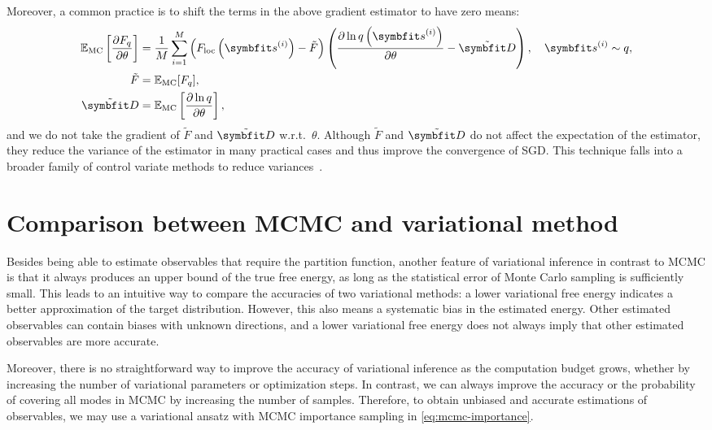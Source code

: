 Moreover, a common practice is to shift the terms in the above gradient estimator to have zero means:
\begin{align}
\bbE_\text{MC}\left[ \frac{\partial F_q}{\partial \theta} \right]
&= \frac{1}{M} \sum_{i = 1}^M \left( F_\text{loc}\left( \vs^{(i)} \right) - \tilde{F} \right) \left( \frac{\partial \ln q\left( \vs^{(i)} \right)}{\partial \theta} - \tilde{\vD} \right), \quad
\vs^{(i)} \sim q, \label{eq:fq-grad-baseline} \\
\tilde{F} &= \bbE_\text{MC}[F_q], \\
\tilde{\vD} &= \bbE_\text{MC}\left[ \frac{\partial \ln q}{\partial \theta} \right],
\end{align}
and we do not take the gradient of $\tilde{F}$ and $\tilde{\vD}$ w.r.t.\ $\theta$. Although $\tilde{F}$ and $\tilde{\vD}$ do not affect the expectation of the estimator, they reduce the variance of the estimator in many practical cases and thus improve the convergence of SGD. This technique falls into a broader family of control variate methods to reduce variances~\cite{ranganath2014black, wan2019neural}.

\section{Comparison between MCMC and variational method}
\label{sec:compare-mcmc}

Besides being able to estimate observables that require the partition function, another feature of variational inference in contrast to MCMC is that it always produces an upper bound of the true free energy, as long as the statistical error of Monte Carlo sampling is sufficiently small. This leads to an intuitive way to compare the accuracies of two variational methods: a lower variational free energy indicates a better approximation of the target distribution. However, this also means a systematic bias in the estimated energy. Other estimated observables can contain biases with unknown directions, and a lower variational free energy does not always imply that other estimated observables are more accurate.

Moreover, there is no straightforward way to improve the accuracy of variational inference as the computation budget grows, whether by increasing the number of variational parameters or optimization steps. In contrast, we can always improve the accuracy or the probability of covering all modes in MCMC by increasing the number of samples. Therefore, to obtain unbiased and accurate estimations of observables, we may use a variational ansatz with MCMC importance sampling in \cref{eq:mcmc-importance}.

